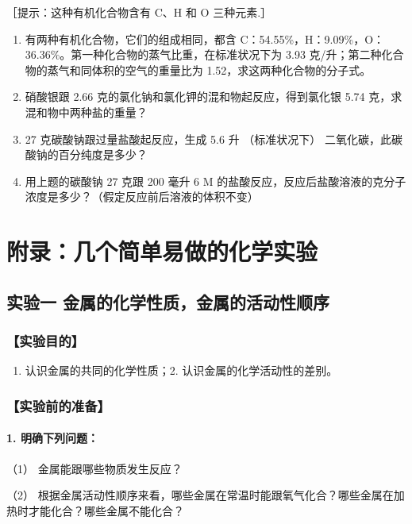［提示：这种有机化合物含有 C、H 和 O 三种元素.］

\begin{enumerate}[start=27]
\item
  有两种有机化合物，它们的组成相同，都含
  C：54.55\%，H：9.09\%，O：36.36\%。第一种化合物的蒸气比重，在标准状况下为
  3.93 克/升；第二种化合物的蒸气和同体积的空气的重量比为
  1.52，求这两种化合物的分子式。
\item
  硝酸银跟 2.66 克的氯化钠和氯化钾的混和物起反应，得到氯化银 5.74
  克，求混和物中两种盐的重量？
\item
  27 克碳酸钠跟过量盐酸起反应，生成 5.6 升 （标准状况下）
  二氧化碳，此碳酸钠的百分纯度是多少？
\item
  用上题的碳酸钠 27 克跟 200 毫升 6 M
  的盐酸反应，反应后盐酸溶液的克分子浓度是多少？（假定反应前后溶液的体积不变）
\end{enumerate}

\chapter{附录：几个简单易做的化学实验}

\section{实验一 金属的化学性质，金属的活动性顺序}

\subsection{【实验目的】}

\begin{enumerate}
\item
  认识金属的共同的化学性质；2. 认识金属的化学活动性的差别。
\end{enumerate}

\subsection{【实验前的准备】}

\subsubsection{1. 明确下列问题：}

（1） 金属能跟哪些物质发生反应？

（2）
根据金属活动性顺序来看，哪些金属在常温时能跟氧气化合？哪些金属在加热时才能化合？哪些金属不能化合？

